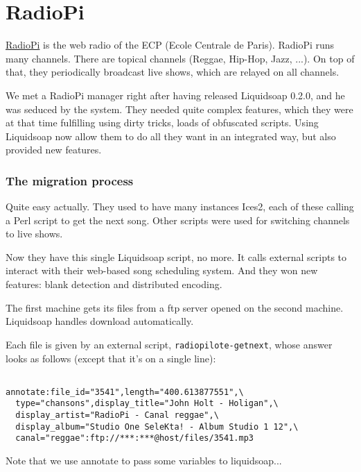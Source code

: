 \section{RadioPi}
\href{http://www.radiopi.org}{RadioPi} is the web radio of the ECP (Ecole Centrale de Paris). RadioPi runs many channels. 
There are topical channels (Reggae, Hip-Hop, Jazz, ...). On top of that, they periodically broadcast live shows,
which are relayed on all channels.

We met a RadioPi manager right after having released Liquidsoap 0.2.0, and he was seduced by the system. They needed 
quite complex features, which they were at that time fulfilling using dirty tricks, loads of obfuscated scripts. 
Using Liquidsoap now allow them to do all they want in an integrated way, but also provided new features.

\subsubsection{The migration process}
Quite easy actually. They used to have many instances Ices2, each of these calling a Perl script to get the next song. 
Other scripts were used for switching channels to live shows.

Now they have this single Liquidsoap script, no more. It calls external scripts to interact with their web-based song 
scheduling system. And they won new features: blank detection and distributed encoding.

The first machine gets its files from a ftp server opened on the second machine.
Liquidsoap handles download automatically.

Each file is given by an external script, \verb+radiopilote-getnext+,
whose answer looks as follows (except that it's on a single line):

\begin{verbatim}

annotate:file_id="3541",length="400.613877551",\
  type="chansons",display_title="John Holt - Holigan",\
  display_artist="RadioPi - Canal reggae",\
  display_album="Studio One SeleKta! - Album Studio 1 12",\
  canal="reggae":ftp://***:***@host/files/3541.mp3
\end{verbatim}
Note that we use annotate to pass some variables to liquidsoap...

